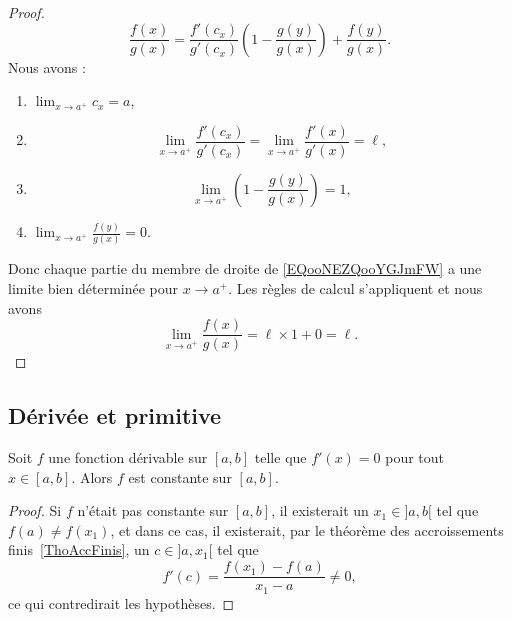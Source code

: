 \begin{proof}
    \begin{equation}        \label{EQooNEZQooYGJmFW}
        \frac{ f(x) }{ g(x) }=\frac{ f'(c_x) }{ g'(c_x) }\left( 1-\frac{ g(y) }{ g(x) } \right)+\frac{ f(y) }{ g(x) }.
    \end{equation}
    Nous avons :
    \begin{enumerate}
        \item
            \( \lim_{x\to a^+} c_x=a\),
        \item
            \begin{equation}
                \lim_{x\to a^+}\frac{ f'(c_x) }{ g'(c_x) }=\lim_{x\to a^+} \frac{ f'(x) }{ g'(x) }=\ell,
            \end{equation}
        \item
            \begin{equation}
                \lim_{x\to a^+} \left( 1-\frac{ g(y) }{ g(x) } \right)=1,
            \end{equation}
        \item
            \( \lim_{x\to a^+} \frac{ f(y) }{ g(x) }=0\).
    \end{enumerate}
    Donc chaque partie du membre de droite de \eqref{EQooNEZQooYGJmFW} a une limite bien déterminée pour \( x\to a^+\). Les règles de calcul s'appliquent et nous avons
    \begin{equation}
        \lim_{x\to a^+} \frac{ f(x) }{ g(x) }=\ell\times 1+0=\ell.
    \end{equation}
\end{proof}

\subsection{Dérivée et primitive}

\begin{corollary}       \label{CORooEOERooYprteX}
Soit $f$ une fonction dérivable sur $[a,b]$ telle que $f'(x) = 0$ pour tout $x \in [a,b]$. Alors $f$ est constante sur $[a,b]$.
\end{corollary}

\begin{proof}
    Si $f$ n'était pas constante sur $[a,b]$, il existerait un $x_1\in ]a,b[$ tel que $f(a)\neq f(x_1)$, et dans ce cas, il existerait, par le théorème des accroissements finis~\ref{ThoAccFinis}, un $c\in]a,x_1[$ tel que
    \begin{equation}
        f'(c)=\frac{ f(x_1)-f(a) }{ x_1-a }\neq 0,
    \end{equation}
    ce qui contredirait les hypothèses.
\end{proof}

